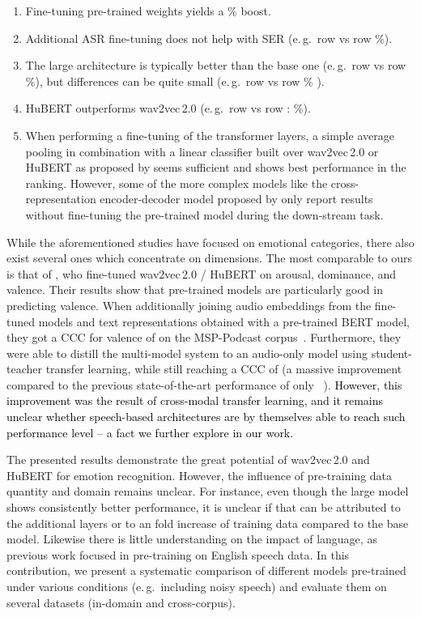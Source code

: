 \documentclass{article}
\newcommand{\review}[1]{\textcolor{black}{#1}}
\newcommand\msppodcast{\mbox{MSP-Podcast}}
\newcommand{\wtov}{wav2vec\,2.0}
\newcommand{\hubert}{HuBERT}
\newcommand{\eg}{e.\,g.\ }
\begin{document}
\begin{enumerate}
    \item Fine-tuning pre-trained weights yields a \% boost.
    \item Additional \ac{ASR} fine-tuning does not help with \ac{SER} (\eg row  vs row  \%).
    \item The large architecture is typically better than the base one (\eg row  vs row  \%),
    but differences can be quite small (\eg row  vs row  \% ).
    \item {\hubert} outperforms {\wtov} (\eg row  vs row : \%).
    \item When performing a fine-tuning of the transformer layers,
    a simple average pooling in combination with a linear classifier built over {\wtov} or {\hubert}
    as proposed by \citet{wang2021finetuned}
    seems sufficient and shows best performance in the ranking.
    However, some of the more complex models
    like the cross-representation encoder-decoder model proposed by \citet{makiuchi2021multimodal}
    only report results without fine-tuning the pre-trained model during the down-stream task.
\end{enumerate}

While the aforementioned studies have focused on emotional categories,
there also exist several ones
which concentrate on dimensions.
The most comparable to ours is that of \citet{srinivasan2021representation},
who fine-tuned {\wtov} / {\hubert} on arousal, dominance, and valence.
Their results show that pre-trained models are particularly good in predicting valence.
When additionally joining audio embeddings from the fine-tuned models
and text representations obtained with a pre-trained BERT model,
they got a \acf{CCC} for valence of 
on the {\msppodcast} corpus~\citep{lotfian2019msppodcast}.
Furthermore, they were able to distill the multi-model system
to an audio-only model using student-teacher transfer learning,
while still reaching a \ac{CCC} of 
(a massive improvement compared to the previous state-of-the-art performance of only ~\citep{li2021contrastive}).
\review{
However, 
this improvement was the result of cross-modal transfer learning, 
and it remains unclear whether speech-based architectures
are by themselves able
to reach such performance level
-- a fact we further explore in our work.
}

The presented results demonstrate the great potential of {\wtov} and {\hubert} for emotion recognition. 
However, the influence of pre-training data quantity and domain remains unclear.
For instance, even though the large model shows consistently better performance,
it is unclear if that can be attributed to the additional layers
or to an  fold increase of training data compared to the base model. 
Likewise there is little understanding on the impact of language,
as previous work focused in pre-training on English speech data.
In this contribution,
we present a systematic comparison of different models
pre-trained under various conditions
(\eg including noisy speech)
and evaluate them on several datasets
(in-domain and cross-corpus).
\end{document}
